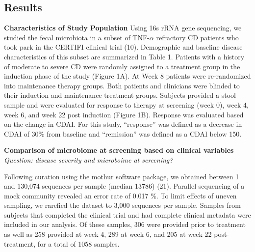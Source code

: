\documentclass[11pt,]{article}
\begin{document}
\subsection{Results}\label{results}

\textbf{Characteristics of Study Population} Using 16s rRNA gene
sequencing, we studied the fecal microbiota in a subset of
TNF-\({\alpha}\) refractory CD patients who took park in the CERTIFI
clinical trial (10). Demographic and baseline disease characteristics of
this subset are summarized in Table 1. Patients with a history of
moderate to severe CD were randomly assigned to a treatment group in the
induction phase of the study (Figure 1A). At Week 8 patients were
re-randomized into maintenance therapy groups. Both patients and
clinicians were blinded to their induction and maintenance treatment
groups. Subjects provided a stool sample and were evaluated for response
to therapy at screening (week 0), week 4, week 6, and week 22 post
induction (Figure 1B). Response was evaluated based on the change in
CDAI. For this study, ``response'' was defined as a decrease in CDAI of
30\% from baseline and ``remission'' was defined as a CDAI below 150.

\textbf{Comparison of microbiome at screening based on clinical
variables} \emph{Question: disease severity and microboime at
screening?}

Following curation using the mothur software package, we obtained
between 1 and 130,074 sequences per sample (median 13786) (21). Parallel
sequencing of a mock community revealed an error rate of 0.017 \%. To
limit effects of uneven sampling, we rarefied the dataset to 3,000
sequences per sample. Samples from subjects that completed the clinical
trial and had complete clinical metadata were included in our analysis.
Of these samples, 306 were provided prior to treatment as well as 258
provided at week 4, 289 at week 6, and 205 at week 22 post-treatment,
for a total of 1058 samples.
\end{document}
